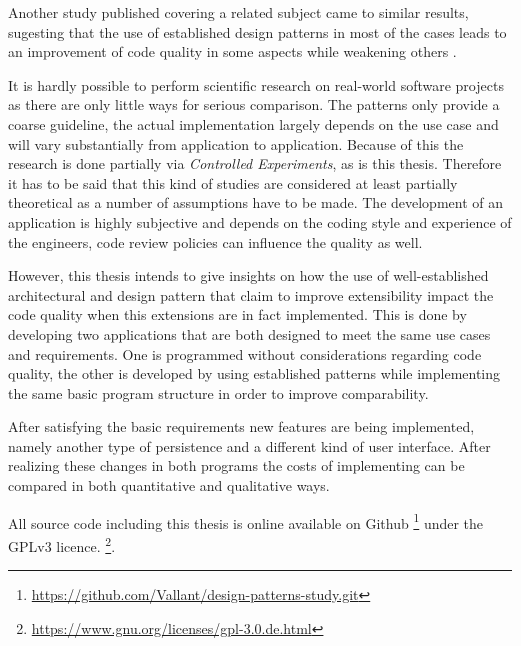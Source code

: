 Another study published covering a related subject came to similar results, sugesting that the use of established design patterns in most of the cases leads to an improvement of code quality in some aspects while weakening others \cite{quality2}.

It is hardly possible to perform scientific research on real-world software projects as there are only little ways for serious comparison. The patterns only provide a coarse guideline, the actual implementation largely depends on the use case and will vary substantially from application to application. Because of this the research is done partially via \emph{Controlled Experiments}, as is this thesis. Therefore it has to be said that this kind of studies are considered at least partially theoretical as a number of assumptions have to be made. The development of an application is highly subjective and depends on the coding style and experience of the engineers, code review policies can influence the quality as well.

However, this thesis intends to give insights on how the use of well-established architectural and design pattern that claim to improve extensibility impact the code quality when this extensions are in fact implemented. This is done by developing two applications that are both designed to meet the same use cases and requirements. One is programmed without considerations regarding code quality, the other is developed by using established patterns while implementing the same basic program structure in order to improve comparability.

After satisfying the basic requirements new features are being implemented, namely another type of persistence and a different kind of user interface. After realizing these changes in both programs the costs of implementing can be compared in both quantitative and qualitative ways. 

All source code including this thesis is online available on Github \footnote{\href{https://github.com/Vallant/design-patterns-study.git}{https://github.com/Vallant/design-patterns-study.git}} under the GPLv3 licence. \footnote{\href{https://www.gnu.org/licenses/gpl-3.0.de.html}{https://www.gnu.org/licenses/gpl-3.0.de.html}}.

